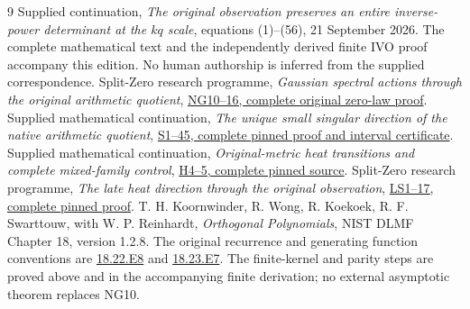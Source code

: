 \documentclass[11pt]{article}
\begin{document}
\begin{thebibliography}{9}
 Supplied continuation, \emph{The original observation
preserves an entire inverse-power determinant at the $kq$ scale},
equations (1)--(56), 21 September 2026. The complete mathematical text
and the independently derived finite IVO proof accompany this edition.
No human authorship is inferred from the supplied correspondence.
 Split-Zero research programme,
\emph{Gaussian spectral actions through the original arithmetic quotient},
\href{https://github.com/KokunoYumeto/zeta-function-research-reader/blob/5992ad50c0f2a06921f1fcaded7b4e38097c0739/workbenches/splitzero-tandem/continuations/20260920-original-kernel-mixed-determinants/providers/NATIVE_GAUSSIAN_TRANSFER.tex#L203}{NG10--16, complete original zero-law proof}.
 Supplied mathematical continuation,
\emph{The unique small singular direction of the native arithmetic quotient},
\href{https://github.com/KokunoYumeto/zeta-function-research-reader/blob/0fd693c844aad9117e30ec447c59864a28af10f3/workbenches/splitzero-tandem/continuations/20260921-native-spectral-real-pair/003/NATIVE_SMALLEST_SINGULAR_PROOF.tex}{S1--45, complete pinned proof and interval certificate}.
 Supplied mathematical continuation,
\emph{Original-metric heat transitions and complete mixed-family control},
\href{https://github.com/KokunoYumeto/zeta-function-research-reader/blob/0fd693c844aad9117e30ec447c59864a28af10f3/workbenches/splitzero-tandem/continuations/20260921-native-spectral-real-pair/003/RETAINED_PROFILE_PROOF.tex}{H4--5, complete pinned source}.
 Split-Zero research programme,
\emph{The late heat direction through the original observation},
\href{https://github.com/KokunoYumeto/zeta-function-research-reader/blob/0fd693c844aad9117e30ec447c59864a28af10f3/workbenches/splitzero-tandem/continuations/20260921-native-spectral-real-pair/003/LATE_HEAT_ORIGINAL_KERNEL_RECEIVER.tex}{LS1--17, complete pinned proof}.
 T. H. Koornwinder, R. Wong, R. Koekoek,
R. F. Swarttouw, with W. P. Reinhardt, \emph{Orthogonal Polynomials},
NIST DLMF Chapter 18, version 1.2.8.
The original recurrence and generating function conventions are
\href{https://dlmf.nist.gov/18.22.E8}{18.22.E8} and
\href{https://dlmf.nist.gov/18.23.E7}{18.23.E7}.
The finite-kernel and parity steps are proved above and in the
accompanying finite derivation; no external asymptotic theorem replaces NG10.
\end{thebibliography}
\end{document}
